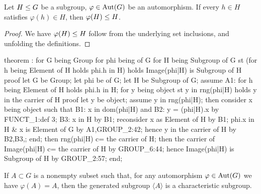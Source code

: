 \begin{theorem}
Let $H\leq G$ be a subgroup, $\varphi\in\operatorname{Aut}(G)$ be an automorphism.
If every $h\in H$ satisfies $\varphi(h)\in H$, then $\varphi(H)\leq H$.
\end{theorem}

\begin{proof}
We have $\varphi(H)\leq H$ follow from the underlying set
inclusions, and unfolding the definitions.
\end{proof}

\nwenddocs{}\endmoddef\nwstartdeflinemarkup{}\nwenddeflinemarkup
theorem :
  for G being Group
  for phi being  of G
  for H being Subgroup of G
  st (for h being Element of H
      holds phi.h in H)
  holds Image(phi|H) is Subgroup of H
proof
  let G be Group;
  let phi be  of G;
  let H be Subgroup of G;
  assume A1: for h being Element of H holds phi.h in H;
  for y being object st y in rng(phi|H) holds y in the carrier of H
  proof
    let y be object;
    assume y in rng(phi|H);
    then consider x being object such that
    B1: x in dom(phi|H) and
    B2: y = (phi|H).x
    by FUNCT_1:def 3;
    B3: x in H by B1;
    reconsider x as Element of H by B1;
    phi.x in H & x is Element of G by A1,GROUP_2:42;
    hence y in the carrier of H by B2,B3,;
  end;
  then rng(phi|H) c= the carrier of H;
  then the carrier of Image(phi|H) c= the carrier of H by GROUP_6:44;
  hence Image(phi|H) is Subgroup of H by GROUP_2:57;
end;
\eatline
{}\nwendcode{}\nwdocspar
\begin{theorem}
If $A\subset G$ is a nonempty subset such that, for any automorphism
$\varphi\in\operatorname{Aut}(G)$ we have $\varphi(A) = A$, then the generated
subgroup $\langle A\rangle$ is a characteristic subgroup.
\end{theorem}

